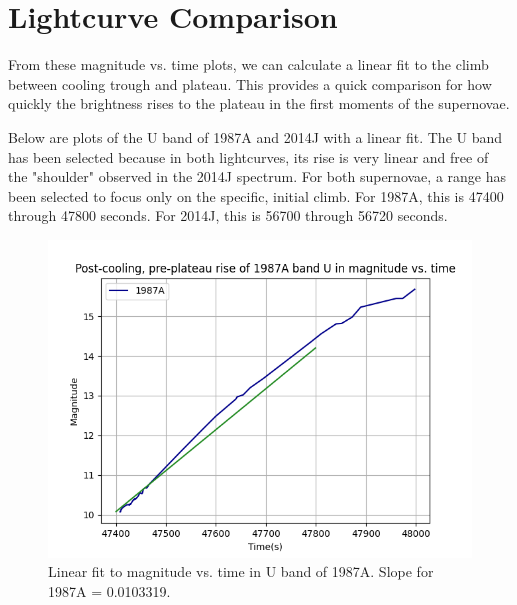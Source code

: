 \section{Lightcurve Comparison}

From these magnitude vs. time plots, we can calculate a linear fit to the climb between cooling trough and plateau. This provides a quick comparison for how quickly the brightness rises to the plateau in the first moments of the supernovae.

Below are plots of the U band of 1987A and 2014J with a linear fit. The U band has been selected because in both lightcurves, its rise is very linear and free of the "shoulder" observed in the 2014J spectrum. For both supernovae, a range has been selected to focus only on the specific, initial climb. For 1987A, this is 47400 through 47800 seconds. For 2014J, this is 56700 through 56720 seconds.

\begin{figure}[h]
	\includegraphics[width=1.0\textwidth]{1987A_U_linear.png}
	\caption{Linear fit to magnitude vs. time in U band of 1987A. Slope for 1987A = 0.0103319.}
\end{figure}

